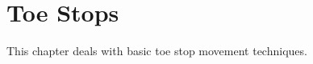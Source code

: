 \chapter{Toe Stops}
\label{ch:toe_stops}


This chapter deals with basic toe stop movement techniques.



